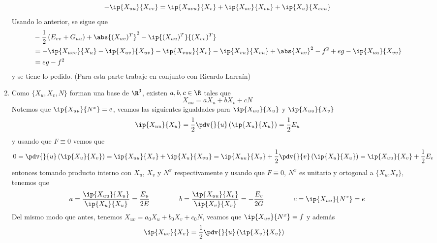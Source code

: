 \documentclass{article}
\begin{document}
\begin{enumerate}
\begin{equation*}
        -\ip{X_{uu}}{X_{vv}}=\ip{X_{uvu}}{X_{v}}+\ip{X_{uv}}{X_{vu}}+\ip{X_{u}}{X_{vvu}}
    \end{equation*}
    Usando lo anterior, se sigue que
    \begin{align*}
        & -\frac{1}{2}\left(E_{vv}+G_{uu}\right)+\abs{(X_{uv})^{T}}^{2}-\ip{(X_{uu})^{T}}
        {(X_{vv})^{T}} \\
        &= -\ip{X_{uvv}}{X_{u}}-\ip{X_{uv}}{X_{uv}}-\ip{X_{vuu}}{X_{v}}-\ip{X_{vu}}{X_{vu}}
        +\abs{X_{uv}}^{2}-f^{2}+eg-\ip{X_{uu}}{X_{vv}} \\
        &= eg-f^{2}
    \end{align*}
    y se tiene lo pedido. (Para esta parte trabaje en conjunto con Ricardo Larraín)
\newpage

    \item Como $\{X_{u},X_{v},N\}$ forman una base de $\R^{3}$, existen $a,b,c\in\R$ tales que
    \begin{equation*}
        X_{uu}=aX_{u}+bX_{v}+cN
    \end{equation*}
    Notemos que $\ip{X_{uu}}{N^{x}}=e$, veamos las siguientes igualdades para $\ip{X_{uu}}{X_{u}}$ 
    y $\ip{X_{uu}}{X_{v}}$
    \begin{equation*}
        \ip{X_{uu}}{X_{u}}=\frac{1}{2}\pdv{}{u}\left(\ip{X_{u}}{X_{u}}\right)=\frac{1}{2}E_{u}
    \end{equation*}
    y usando que $F\equiv0$ vemos que
    \begin{equation*}
        0=\pdv{}{u}\left(\ip{X_{u}}{X_{v}}\right)=\ip{X_{uu}}{X_{v}}+\ip{X_{u}}{X_{vu}}
        =\ip{X_{uu}}{X_{v}}+\frac{1}{2}\pdv{}{v}\left(\ip{X_{u}}{X_{u}}\right)
        =\ip{X_{uu}}{X_{v}}+\frac{1}{2}E_{v}
    \end{equation*}
    entonces tomando producto interno con $X_{u}$, $X_{v}$ y $N^{x}$ respectivamente y usando que
    $F\equiv0$, $N^{x}$ es unitario y ortogonal a $\{X_{u}$,$X_{v}\}$, tenemos que
    \begin{equation*}
        a=\frac{\ip{X_{uu}}{X_{u}}}{\ip{X_{u}}{X_{u}}}=\frac{E_{u}}{2E}\hspace{1.5cm}
        b=\frac{\ip{X_{uu}}{X_{v}}}{\ip{X_{v}}{X_{v}}}=-\frac{E_{v}}{2G}\hspace{1.5cm}
        c=\ip{X_{uu}}{N^{x}}=e
    \end{equation*}
    Del mismo modo que antes, tenemos $X_{uv}=a_{0}X_{u}+b_{0}X_{v}+c_{0}N$, veamos que 
    $\ip{X_{uv}}{N^{x}}=f$ y además
    \begin{align*}
        \ip{X_{uv}}{X_{v}} &= \frac{1}{2}\pdv{}{u}\left(\ip{X_{v}}{X_{v}}\right)

\end{align*}
\end{enumerate}
\end{document}
